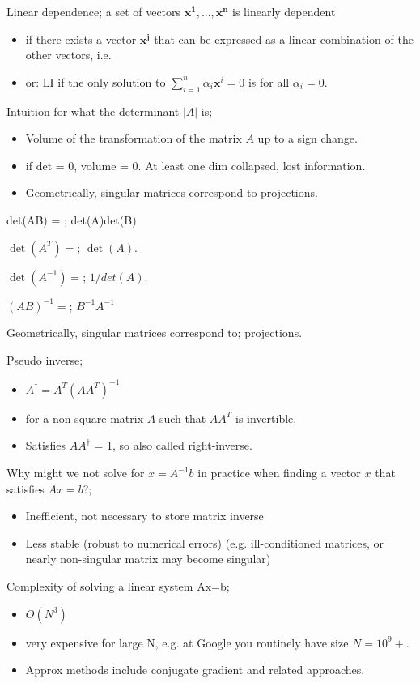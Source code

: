 \documentclass{article}
\begin{document}
	
Linear dependence; a set of vectors $\mathbf{x^1, ..., x^n}$ is linearly dependent  \begin{itemize} \item if there exists a vector $\mathbf{x^j}$ that can be expressed as a linear combination of the other vectors, i.e. \item or: LI if the only solution to $\sum_{i=1}^{n}\alpha_i\mathbf{x}^i=0$ is for all $\alpha_i = 0$. \end{itemize}
	
Intuition for what the determinant $|A|$ is; \begin{itemize} \item Volume of the transformation of the matrix $A$ up to a sign change. \item if det = 0, volume = 0. At least one dim collapsed, lost information. \item Geometrically, singular matrices correspond to projections. \end{itemize}

det(AB) = ; det(A)det(B)

$\det(A^T)=$; $\det(A)$.

$\det(A^{-1})=$; $1/det(A)$.

$(AB)^{-1}=$; $B^{-1}A^{-1}$

Geometrically, singular matrices correspond to; projections.

Pseudo inverse; \begin{itemize} \item $A^\dagger=A^T(AA^T)^{-1}$ \item for a non-square matrix $A$ such that $AA^T$ is invertible. \item Satisfies $AA^\dagger$ = 1, so also called right-inverse. \end{itemize}

Why might we not solve for $x=A^{-1}b$ in practice when finding a vector $x$ that satisfies $Ax=b$?; \begin{itemize} \item Inefficient, not necessary to store matrix inverse \item Less stable (robust to numerical errors) (e.g. ill-conditioned matrices, or nearly non-singular matrix may become singular) \end{itemize} 

Complexity of solving a linear system Ax=b; \begin{itemize} \item $O(N^3)$ \item very expensive for large N, e.g. at Google you routinely have size $N=10^9+$. \item Approx methods include conjugate gradient and related approaches. \end{itemize}
	
\end{document}
